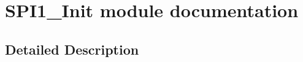 \hypertarget{group___s_p_i1___init__module}{}\section{S\+P\+I1\+\_\+\+Init module documentation}
\label{group___s_p_i1___init__module}


\subsection{Detailed Description}
